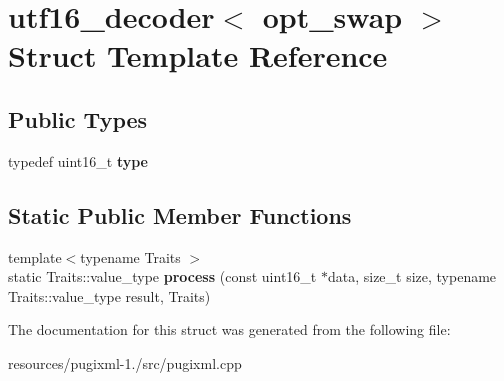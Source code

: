 \hypertarget{structutf16__decoder}{\section{utf16\+\_\+decoder$<$ opt\+\_\+swap $>$ Struct Template Reference}
\label{structutf16__decoder}
}
\subsection*{Public Types}
\begin{DoxyCompactItemize}
\item 
\hypertarget{structutf16__decoder_a6464d996125f65a0fc84d5fa5f11b878}{typedef uint16\+\_\+t {\bfseries type}}\label{structutf16__decoder_a6464d996125f65a0fc84d5fa5f11b878}

\end{DoxyCompactItemize}
\subsection*{Static Public Member Functions}
\begin{DoxyCompactItemize}
\item 
\hypertarget{structutf16__decoder_a76791119a94c0105611212b8ee1ea86d}{{\footnotesize template$<$typename Traits $>$ }\\static Traits\+::value\+\_\+type {\bfseries process} (const uint16\+\_\+t $\ast$data, size\+\_\+t size, typename Traits\+::value\+\_\+type result, Traits)}\label{structutf16__decoder_a76791119a94c0105611212b8ee1ea86d}

\end{DoxyCompactItemize}


The documentation for this struct was generated from the following file\+:\begin{DoxyCompactItemize}
\item 
resources/pugixml-\/1./src/pugixml.\+cpp\end{DoxyCompactItemize}
